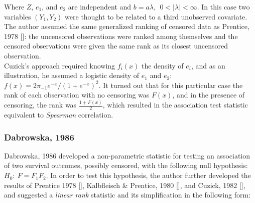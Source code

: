 \documentclass[]{article}
\begin{document}
Where $Z$, $e_1$, and $e_2$ are independent and  $b=a\lambda,~~0<|\lambda|<\infty$. In this case two variables $(Y_1, Y_2)$ were thought to be related to a third unobserved covariate.\\
The author assumed the same generalized ranking of censored data as Prentice, 1978 [\cite{prentice1978linear}]: the uncensored observations were ranked among themselves and the censored observations were given the same rank as its closest uncensored observation.\\
Cuzick's approach required knowing $f_i(x)$ the density of $e_i$, and as an illustration, he assumed a logistic density of $e_1$ and $e_2$:  $f(x) = 2\pi_{-1} e^{-x}/(1+e^{-x})^2$. It turned out that for this particular case the rank of each observation with no censoring was $F(x)$, and in the presence of censoring, the rank was $\frac{1+F(x)}{2}$, which resulted in the association test statistic equivalent to \emph{Spearman} correlation.

\subsubsection{Dabrowska, 1986}
Dabrowska, 1986 \cite{dabrowska1986rank} developed a non-parametric statistic for testing an association of two survival outcomes, possibly censored, with the following null hypothesis: $H_0:~F=F_1 F_2$. In order to test this hypothesis, the author further developed the results of Prentice 1978 [\cite{prentice1978linear}], Kalbfleisch \& Prentice, 1980 [\cite{kalbfleisch2011statistical}], and Cuzick, 1982 [\cite{cuzick1982rank}], and suggested a \emph{linear rank} statistic and its simplification in the following form:
\end{document}
